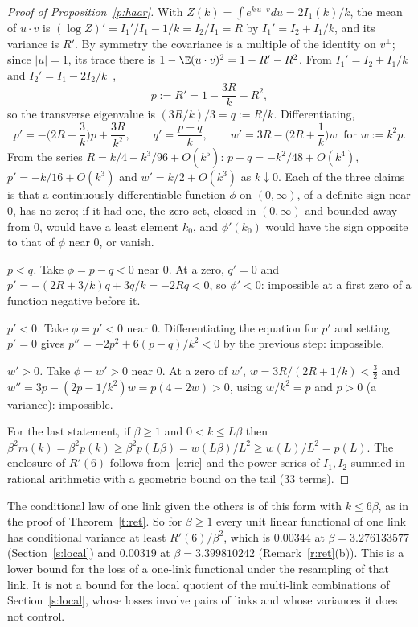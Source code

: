 \begin{proof}[Proof of Proposition~\ref{p:haar}]
With $Z(k)=\int e^{k\,u\cdot v}du=2I_1(k)/k$, the mean of $u\cdot v$ is $(\log Z)'=I_1'/I_1-1/k=I_2/I_1=R$ by
$I_1'=I_2+I_1/k$, and its variance is $R'$. By symmetry the covariance is a multiple of the identity on
$v^\perp$; since $|u|=1$, its trace there is $1-\E(u\cdot v)^2=1-R'-R^2$. From $I_1'=I_2+I_1/k$ and
$I_2'=I_1-2I_2/k$~\cite[10.29.2]{DLMF},
\begin{equation}\label{e:ric}
p:=R'=1-\frac{3R}{k}-R^2,
\end{equation}
so the transverse eigenvalue is $(3R/k)/3=q:=R/k$. Differentiating,
\[
p'=-\Big(2R+\frac3k\Big)p+\frac{3R}{k^2},\qquad q'=\frac{p-q}{k},\qquad
w'=3R-\Big(2R+\frac1k\Big)w\ \text{ for }w:=k^2p .
\]
From the series $R=k/4-k^3/96+O(k^5)$: $p-q=-k^2/48+O(k^4)$, $p'=-k/16+O(k^3)$ and $w'=k/2+O(k^3)$ as
$k\downarrow0$. Each of the three claims is that a continuously differentiable function $\phi$ on $(0,\infty)$,
of a definite sign near $0$, has no zero; if it had one, the zero set, closed in $(0,\infty)$ and bounded away
from $0$, would have a least element $k_0$, and $\phi'(k_0)$ would have the sign opposite to that of $\phi$
near $0$, or vanish.

\emph{$p<q$.} Take $\phi=p-q<0$ near $0$. At a zero, $q'=0$ and $p'=-(2R+3/k)q+3q/k=-2Rq<0$, so $\phi'<0$:
impossible at a first zero of a function negative before it.

\emph{$p'<0$.} Take $\phi=p'<0$ near $0$. Differentiating the equation for $p'$ and setting $p'=0$ gives
$p''=-2p^2+6(p-q)/k^2<0$ by the previous step: impossible.

\emph{$w'>0$.} Take $\phi=w'>0$ near $0$. At a zero of $w'$, $w=3R/(2R+1/k)<\tfrac32$ and
$w''=3p-(2p-1/k^2)w=p(4-2w)>0$, using $w/k^2=p$ and $p>0$ (a variance): impossible.

For the last statement, if $\beta\ge1$ and $0<k\le L\beta$ then
$\beta^2m(k)=\beta^2p(k)\ge\beta^2p(L\beta)=w(L\beta)/L^2\ge w(L)/L^2=p(L)$. The enclosure of $R'(6)$ follows
from~\eqref{e:ric} and the power series of $I_1,I_2$ summed in rational arithmetic with a geometric bound on
the tail (33 terms).
\end{proof}

\begin{remark}\label{r:haar}
The conditional law of one link given the others is of this form with $k\le6\beta$, as in the proof of
Theorem~\ref{t:ret}. So for $\beta\ge1$ every unit linear functional of one link has conditional variance at
least $R'(6)/\beta^2$, which is $0.00344$ at $\beta=3.276133577$ (Section~\ref{s:local}) and $0.00319$ at
$\beta=3.399810242$ (Remark~\ref{r:ret}(b)). This is
a lower bound for the loss of a one-link functional under the resampling of that link. It is not a bound for
the local quotient of the multi-link combinations of Section~\ref{s:local}, whose losses involve pairs of
links and whose variances it does not control.
\end{remark}

